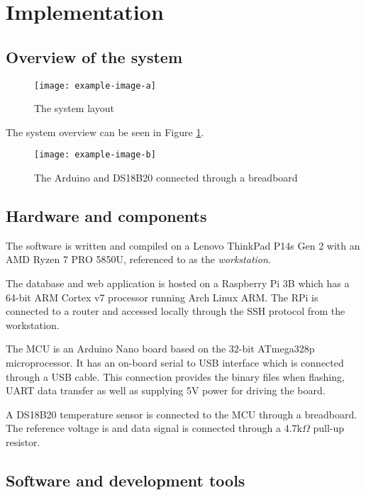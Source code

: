 \section{Implementation}%
\label{sec:implementation}

\subsection{Overview of the system}%
\label{sub:overview_of_the_system}
\begin{figure}[h]
  \centering
  \texttt{[image: example-image-a]}
  \caption{The system layout}
  \label{fig:systemimg}
\end{figure}
The system overview can be seen in Figure \ref{fig:systemimg}. 
\begin{figure}[h]
  \centering
  \texttt{[image: example-image-b]}
  \caption{The Arduino and DS18B20 connected through a breadboard}
  \label{fig:breadboard}
\end{figure}

\newpage

\subsection{Hardware and components}%
\label{sub:hardware_and_components}
The software is written and compiled on a Lenovo ThinkPad P14s Gen 2 with an AMD Ryzen 7 PRO 5850U, referenced to as the \textit{workstation}.

The database and web application is hosted on a Raspberry Pi 3B which has a 64-bit ARM Cortex v7 processor running Arch Linux ARM. The RPi is connected to a router and accessed locally through the SSH protocol from the workstation.

The MCU is an Arduino Nano board based on the 32-bit ATmega328p microprocessor. It has an on-board serial to USB interface which is connected through a USB cable. This connection provides the binary files when flashing, UART data transfer as well as supplying 5V power for driving the board.

A DS18B20 temperature sensor is connected to the MCU through a breadboard. The reference voltage is and data signal is connected through a 4.7k$\Omega$ pull-up resistor.

\subsection{Software and development tools}%
\label{sub:software_and_development_tools}
